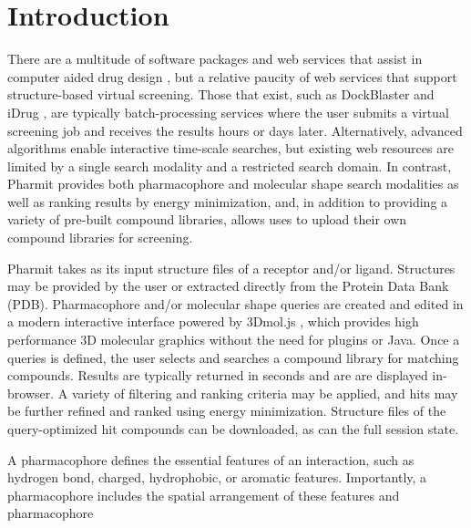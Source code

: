 \section{Introduction}

There are a multitude of software packages and web services that assist in computer aided drug design \cite{Villoutreix_2013}, but a relative paucity of web services that support structure-based virtual screening.  Those that exist, such as DockBlaster \cite{Irwin_2009} and iDrug \cite{Wang_2014}, are typically batch-processing services where the user submits a virtual screening job and receives the results hours or days later.  Alternatively, advanced algorithms enable interactive time-scale searches, but existing web resources \cite{Koes_2012,Koes_2012z} are limited by a single search modality and a restricted search domain.  In contrast, Pharmit provides both pharmacophore and molecular shape search modalities as well as ranking results by energy minimization, and, in addition to providing a variety of pre-built compound libraries, allows uses to upload their own compound libraries for screening. 

Pharmit takes as its input structure files of a receptor and/or ligand. Structures may be provided by the user or extracted directly from the Protein Data Bank (PDB). 
Pharmacophore and/or molecular shape queries are created and edited in a modern interactive interface powered by 3Dmol.js \cite{Rego_2014}, which provides high performance 3D molecular graphics without the need for plugins or Java. Once a queries is defined, the user selects and searches a compound library for matching compounds.  Results are typically returned in seconds and are are displayed in-browser.  A variety of filtering and ranking criteria may be applied, and hits may be further refined and ranked using energy minimization. Structure files of the query-optimized hit compounds can be downloaded, as can the full session state.



A pharmacophore \cite{Koes_2015rev,Yang_2010,Leach_2010} defines the essential features of an interaction, such as hydrogen bond, charged, hydrophobic, or aromatic features. Importantly, a pharmacophore includes the spatial arrangement of these features and pharmacophore

